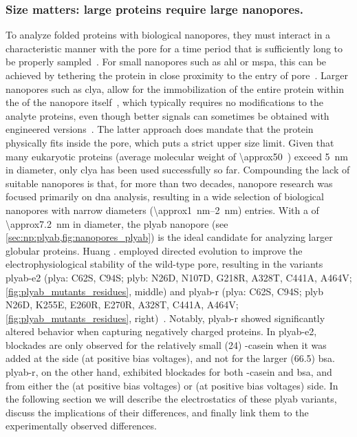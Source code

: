 \subsubsection{Size matters: large proteins require large nanopores.}
%

To analyze folded proteins with biological nanopores, they must interact in a characteristic manner with the
pore for a time period that is sufficiently long to be properly sampled~\cite{Willems-VanMeervelt-2017}. For
small nanopores such as \gls{ahl} or \gls{mspa}, this can be achieved by tethering the protein in close
proximity to the entry of pore~\cite{Movileanu-2000,Fahie-2015,Ho-2015,Laszlo-2016,Thakur-2019}. Larger
nanopores such as \gls{clya}, allow for the immobilization of the entire protein within the \lumen{} of the
nanopore
itself~\cite{Soskine-2012,Soskine-2013,Soskine-Biesemans-2015,Biesemans-2015,Wloka-2016,VanMeervelt-2017,Galenkamp-2018,Galenkamp-2020},
which typically requires no modifications to the analyte proteins, even though better signals can sometimes be
obtained with engineered versions~\cite{Soskine-Biesemans-2015,Galenkamp-2020}. The latter approach does
mandate that the protein physically fits inside the pore, which puts a strict upper size limit. Given that
many eukaryotic proteins (average molecular weight of \SI{\approx50}{\kDa}~\cite{Kozlowski-2016}) exceed
\SI{5}{\nm} in diameter, only \gls{clya} has been used successfully so far. Compounding the lack of suitable
nanopores is that, for more than two decades, nanopore research was focused primarily on \gls{dna} analysis,
resulting in a wide selection of biological nanopores with narrow diameters (\SIrange{\approx1}{2}{\nm})
entries. With a \lumen{} of \SI{\approx7.2}{\nm} in diameter, the \gls{plyab} nanopore (see
\cref{sec:np:plyab,fig:nanopores_plyab}) is the ideal candidate for analyzing larger globular proteins. Huang
\etal. employed directed evolution to improve the electrophysiological stability of the wild-type pore,
resulting in the variants \gls{plyab-e2} (\gls{plya}: C62S, C94S; \gls{plyb}: N26D, N107D, G218R, A328T,
C441A, A464V; \cref{fig:plyab_mutants_residues}, middle) and \gls{plyab-r} (\gls{plya}: C62S, C94S; \gls{plyb}
N26D, K255E, E260R, E270R, A328T, C441A, A464V; \cref{fig:plyab_mutants_residues}, right)~\cite{Huang-2020}.
Notably, \gls{plyab-r} showed significantly altered behavior when capturing negatively charged proteins. In
\gls{plyab-e2}, blockades are only observed for the relatively small (\SI{24}{\kDa}) \tb-casein when it was
added at the \transi{} side (at positive bias voltages), and not for the larger (\SI{66.5}{\kDa}) \gls{bsa}.
\gls{plyab-r}, on the other hand, exhibited blockades for both \tb-casein and \gls{bsa}, and from either the
\cisi{} (at positive bias voltages) or \transi{} (at positive bias voltages) side. In the following section we
will describe the electrostatics of these \gls{plyab} variants, discuss the implications of their differences,
and finally link them to the experimentally observed differences.


